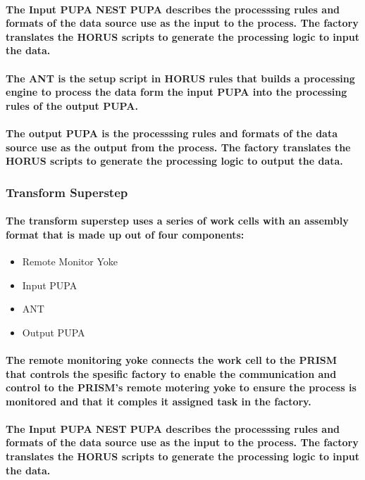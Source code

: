 \documentclass{acm_proc_article-sp}
\begin{document}
\paragraph{The Input PUPA NEST PUPA describes the processsing rules and formats of the data source use as the input to the process. The factory translates the HORUS scripts to generate the processing logic to input the data.}
\paragraph{The ANT is the setup script in HORUS rules that builds a processing engine to process the data form the input PUPA into the processing rules of the output PUPA. }
\paragraph{The output PUPA is the processsing rules and formats of the data source use as the output from the process. The factory translates the HORUS scripts to generate the processing logic to output the data.}
\subsubsection{Transform Superstep}
\paragraph{The transform superstep uses a series of work cells with an assembly format that is made up out of four components:}
\begin{itemize}
\item{Remote Monitor Yoke}
\item{Input PUPA}
\item{ANT}
\item{Output PUPA}
\end{itemize}
\paragraph{The remote monitoring yoke connects the work cell to the PRISM that controls the spesific factory to enable the communication and control to the PRISM's remote motering yoke to ensure the process is monitored and that it comples it assigned task in the factory.}
\paragraph{The Input PUPA NEST PUPA describes the processsing rules and formats of the data source use as the input to the process. The factory translates the HORUS scripts to generate the processing logic to input the data.}
\end{document}
